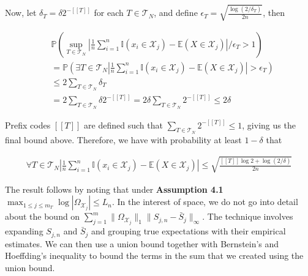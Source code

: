 Now, let $\delta_T = \delta 2^{-[[T]]}$ for each $T \in
\mathcal{T}_N$, and define $\epsilon_T =
\sqrt{\frac{\log(2/\delta_T)}{2n}}$, then

\begin{align}
  &\mathbb{P} \left(
    \sup_{T \in \mathcal{T}_N}
    \left|
      \frac{1}{n} \sum_{i=1}^n \mathbb{I}(x_i \in \mathcal{X}_j) - \mathbb{E}(X \in \mathcal{X}_j)
    \right| / \epsilon_T
    > 1
  \right) \\
  &= \mathbb{P} \left(
    \exists T \in \mathcal{T}_N
    \left|
      \frac{1}{n} \sum_{i=1}^n \mathbb{I}(x_i \in \mathcal{X}_j) - \mathbb{E}(X \in \mathcal{X}_j)
    \right|
    > \epsilon_T
  \right) \\
  &\le 2 \sum_{T \in \mathcal{T}_N} \delta_T \\
  &= 2 \sum_{T \in \mathcal{T}_N} \delta 2^{-[[T]]}
  = 2 \delta \sum_{T \in \mathcal{T}_N} 2^{-[[T]]}
  \le 2 \delta
\end{align}

Prefix codes $[[T]]$ are defined such that $\sum_{T \in \mathcal{T}_N}
2^{-[[T]]} \le 1$, giving us the final bound above. Therefore, we have
with probability at least $1 - \delta$ that

\begin{align}
  \forall T \in \mathcal{T}_N
  \left|
    \frac{1}{n} \sum_{i=1}^n \mathbb{I}(x_i \in \mathcal{X}_j) - \mathbb{E}(X \in \mathcal{X}_j)
  \right|
  \le \sqrt{\frac{[[T]] \log 2 + \log(2/\delta)}{2n}}
\end{align}

The result follows by noting that under \textbf{Assumption 4.1}
$\max_{1\le j\le m_T} \log|\Omega_{\mathcal{X}_j}| \le L_n$. In the
interest of space, we do not go into detail about the bound on
$\sum_{j=1}^m \|\Omega_{\mathcal{X}_j}\|_1 \|S_{j,n} -
\bar{S}_j\|_\infty$. The technique involves expanding $S_{j,n}$ and
$\bar{S}_j$ and grouping true expectations with their empirical
estimates. We can then use a union bound together with Bernstein's and
Hoeffding's inequality to bound the terms in the sum that we created
using the union bound.
